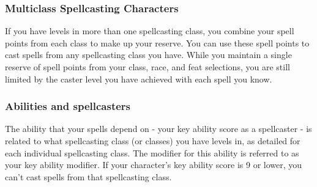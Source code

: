 \subsubsection{Multiclass Spellcasting Characters}
If you have levels in more than one spellcasting class, you combine your spell points from each class to make up your reserve. 
You can use these spell points to cast spells from any spellcasting class you have. 
While you maintain a single reserve of spell points from your class, race, and feat selections, you are still limited by the caster level you have achieved with each spell you know. 
\subsubsection{Abilities and spellcasters}
The ability that your spells depend on - your key ability score as a spellcaster - is related to what spellcasting class (or classes) you have levels in, as detailed for each individual spellcasting class.
The modifier for this ability is referred to as your key ability modifier. 
If your character's key ability score is 9 or lower, you can't cast spells from that spellcasting class.

